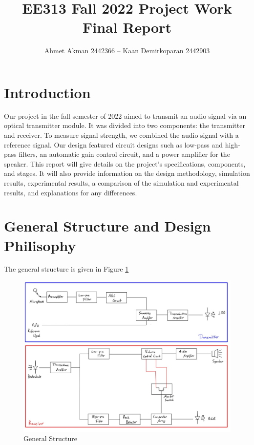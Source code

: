 \documentclass[a4paper,10pt]{IEEEtran}
\title{  EE313 Fall 2022 Project Work  \protect\\ Final Report}
\author{ Ahmet Akman 2442366 -- Kaan Demirkoparan 2442903 }
\date{}
\begin{document}
\thispagestyle{empty}


\maketitle

\section{Introduction}
Our project in the fall semester of 2022 aimed to transmit an audio signal via an optical transmitter module. It was divided into two components: the transmitter and receiver. To measure signal strength, we combined the audio signal with a reference signal. Our design featured circuit designs such as low-pass and high-pass filters, an automatic gain control circuit, and a power amplifier for the speaker. This report will give details on the project's specifications, components, and stages. It will also provide information on the design methodology, simulation results, experimental results, a comparison of the simulation and experimental results, and explanations for any differences.
\section{General Structure and Design Philisophy}
 The general structure is given in Figure \ref{general}
\begin{figure}[htbp!]
    \centering
    \includegraphics[width = 1\linewidth]{general_structure.jpeg}
    \caption{General Structure}
    \label{general}
\end{figure} 
\end{document}

